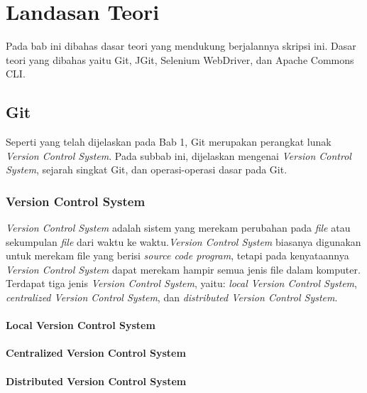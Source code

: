 \chapter{Landasan Teori}
\label{chap:teori}

Pada bab ini dibahas dasar teori yang mendukung berjalannya skripsi ini. Dasar teori yang dibahas yaitu Git, JGit, Selenium WebDriver, dan Apache Commons CLI.

\section{Git}
\label{sec:git} 
Seperti yang telah dijelaskan pada Bab 1, Git merupakan perangkat lunak \textit{Version Control System}. Pada subbab ini, dijelaskan mengenai \textit{Version Control System}, sejarah singkat Git, dan operasi-operasi dasar pada Git.   

\subsection{Version Control System}%
\textit{Version Control System} adalah sistem yang merekam perubahan pada \textit{file} atau sekumpulan \textit{file} dari waktu ke waktu\cite{chacon2014pro}.\textit{Version Control System} biasanya digunakan  untuk merekam file yang berisi \textit{source code program}, tetapi pada kenyataannya \textit{Version Control System} dapat merekam hampir semua jenis file dalam komputer. Terdapat tiga jenis \textit{Version Control System}, yaitu: \textit{local Version Control System}, \textit{centralized Version Control System}, dan \textit{distributed Version Control System}.

\subsubsection{Local Version Control System}%
\subsubsection{Centralized Version Control System}%
\subsubsection{Distributed Version Control System}%



